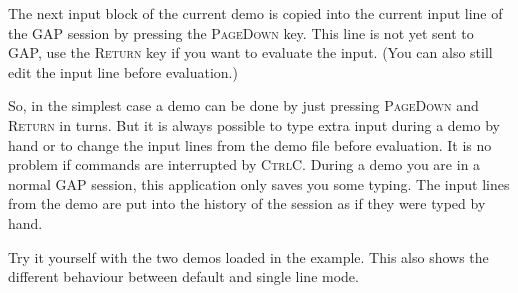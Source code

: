 \documentclass[a4paper,11pt]{report}
\begin{document}
{{ The next input block of the current demo is copied into the current input line
of the \textsf{GAP} session by pressing the \textsc{PageDown} key. This line is not yet sent to \textsf{GAP}, use the \textsc{Return} key if you want to evaluate the input. (You can also still edit the input line
before evaluation.) 

 So, in the simplest case a demo can be done by just pressing \textsc{PageDown} and \textsc{Return} in turns. But it is always possible to type extra input during a demo by hand
or to change the input lines from the demo file before evaluation. It is no
problem if commands are interrupted by \textsc{Ctrl\texttt{}C}. During a demo you are in a normal \textsf{GAP} session, this application only saves you some typing. The input lines from the
demo are put into the history of the session as if they were typed by hand. 

 Try it yourself with the two demos loaded in the example. This also shows the
different behaviour between default and single line mode. }

 }

 

\appendix
\end{document}
